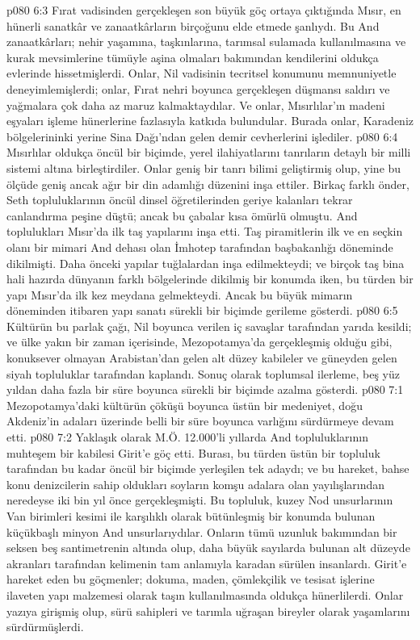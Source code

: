 \vs p080 6:3 Fırat vadisinden gerçekleşen son büyük göç ortaya çıktığında Mısır, en hünerli sanatkâr ve zanaatkârların birçoğunu elde etmede şanlıydı. Bu And zanaatkârları; nehir yaşamına, taşkınlarına, tarımsal sulamada kullanılmasına ve kurak mevsimlerine tümüyle aşina olmaları bakımından kendilerini oldukça evlerinde hissetmişlerdi. Onlar, Nil vadisinin tecritsel konumunu memnuniyetle deneyimlemişlerdi; onlar, Fırat nehri boyunca gerçekleşen düşmansı saldırı ve yağmalara çok daha az maruz kalmaktaydılar. Ve onlar, Mısırlılar’ın madeni eşyaları işleme hünerlerine fazlasıyla katkıda bulundular. Burada onlar, Karadeniz bölgelerininki yerine Sina Dağı’ndan gelen demir cevherlerini işlediler.
\vs p080 6:4 Mısırlılar oldukça öncül bir biçimde, yerel ilahiyatlarını tanrıların detaylı bir milli sistemi altına birleştirdiler. Onlar geniş bir tanrı bilimi geliştirmiş olup, yine bu ölçüde geniş ancak ağır bir din adamlığı düzenini inşa ettiler. Birkaç farklı önder, Seth topluluklarının öncül dinsel öğretilerinden geriye kalanları tekrar canlandırma peşine düştü; ancak bu çabalar kısa ömürlü olmuştu. And toplulukları Mısır’da ilk taş yapılarını inşa etti. Taş piramitlerin ilk ve en seçkin olanı bir mimari And dehası olan İmhotep tarafından başbakanlığı döneminde dikilmişti. Daha önceki yapılar tuğlalardan inşa edilmekteydi; ve birçok taş bina hali hazırda dünyanın farklı bölgelerinde dikilmiş bir konumda iken, bu türden bir yapı Mısır’da ilk kez meydana gelmekteydi. Ancak bu büyük mimarın döneminden itibaren yapı sanatı sürekli bir biçimde gerileme gösterdi.
\vs p080 6:5 Kültürün bu parlak çağı, Nil boyunca verilen iç savaşlar tarafından yarıda kesildi; ve ülke yakın bir zaman içerisinde, Mezopotamya’da gerçekleşmiş olduğu gibi, konuksever olmayan Arabistan’dan gelen alt düzey kabileler ve güneyden gelen siyah topluluklar tarafından kaplandı. Sonuç olarak toplumsal ilerleme, beş yüz yıldan daha fazla bir süre boyunca sürekli bir biçimde azalma gösterdi.
\vs p080 7:1 Mezopotamya’daki kültürün çöküşü boyunca üstün bir medeniyet, doğu Akdeniz’in adaları üzerinde belli bir süre boyunca varlığını sürdürmeye devam etti.
\vs p080 7:2 Yaklaşık olarak M.Ö. 12.000’li yıllarda And topluluklarının muhteşem bir kabilesi Girit’e göç etti. Burası, bu türden üstün bir topluluk tarafından bu kadar öncül bir biçimde yerleşilen tek adaydı; ve bu hareket, bahse konu denizcilerin sahip oldukları soyların komşu adalara olan yayılışlarından neredeyse iki bin yıl önce gerçekleşmişti. Bu topluluk, kuzey Nod unsurlarının Van birimleri kesimi ile karşılıklı olarak bütünleşmiş bir konumda bulunan küçükbaşlı minyon And unsurlarıydılar. Onların tümü uzunluk bakımından bir seksen beş santimetrenin altında olup, daha büyük sayılarda bulunan alt düzeyde akranları tarafından kelimenin tam anlamıyla karadan sürülen insanlardı. Girit’e hareket eden bu göçmenler; dokuma, maden, çömlekçilik ve tesisat işlerine ilaveten yapı malzemesi olarak taşın kullanılmasında oldukça hünerlilerdi. Onlar yazıya girişmiş olup, sürü sahipleri ve tarımla uğraşan bireyler olarak yaşamlarını sürdürmüşlerdi.
